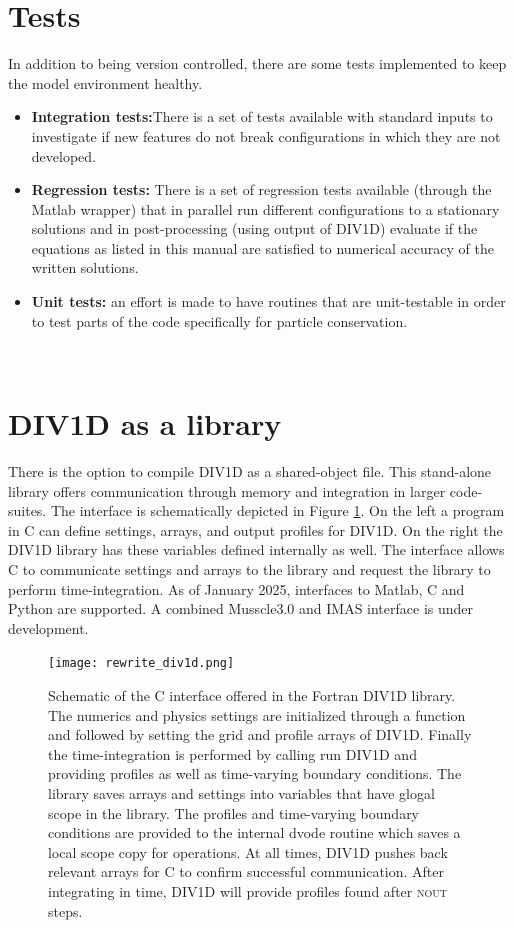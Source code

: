 \documentclass[amsmath,amssymb,a4]{revtex4-2}
\begin{document}
\section{Tests} 
In addition to being version controlled, there are some tests implemented to keep the model environment healthy.\\
\begin{itemize}
    \item \textbf{Integration tests:}There is a set of tests available with standard inputs to investigate if new features do not break configurations in which they are not developed.
    \item \textbf{Regression tests:} There is a set of regression tests available (through the Matlab wrapper) that in parallel run different configurations to a stationary solutions and in post-processing (using output of DIV1D) evaluate if the equations as listed in this manual are satisfied to numerical accuracy of the written solutions.
    \item \textbf{Unit tests:} an effort is made to have routines that are unit-testable in order to test parts of the code specifically for particle conservation.
\end{itemize}
\\

\section{DIV1D as a library}
\noindent There is the option to compile DIV1D as a shared-object file. This stand-alone library offers communication through memory and integration in larger code-suites. The interface is schematically depicted in Figure \ref{fig:div1d_library}. On the left a program in C can define settings, arrays, and output profiles for DIV1D. On the right the DIV1D library has these variables defined internally as well. The interface allows C to communicate settings and arrays to the library and request the library to perform time-integration. As of January 2025, interfaces to Matlab, C and Python are supported. A combined Musscle3.0 and IMAS interface is under development. \\
\begin{figure}
    \centering
    \texttt{[image: rewrite\_div1d.png]}
    \caption{Schematic of the C interface offered in the Fortran DIV1D library. The numerics and physics settings are initialized through a function and followed by setting the grid and profile arrays of DIV1D. Finally the time-integration is performed by calling run DIV1D and providing profiles as well as time-varying boundary conditions. The library saves arrays and settings into variables that have glogal scope in the library. The profiles and time-varying boundary conditions are provided to the internal dvode routine which saves a local scope copy for operations. At all times, DIV1D pushes back relevant arrays for C to confirm successful communication. After integrating in time, DIV1D will provide profiles found after \textsc{nout} steps. }
    \label{fig:div1d_library}
\end{figure}
\end{document}
